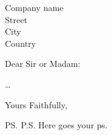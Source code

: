 \documentclass{letter}
\begin{document}
\begin{letter}{Company name \\ Street\\ City\\ Country}
\opening{Dear Sir or Madam:}
\dots
\closing{Yours Faithfully,}
\ps{P.S. Here goes your ps.}
\end{letter}
\end{document}
